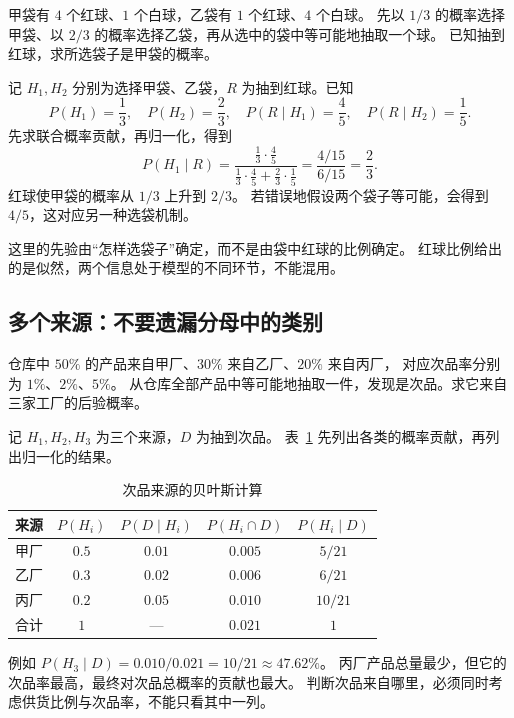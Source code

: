 \documentclass[UTF8,12pt,a4paper,fontset=fandol]{ctexart}
\begin{document}
\begin{example}[抽到红球后判断袋子]
\label{ex:bayes-bags}
甲袋有 $4$ 个红球、$1$ 个白球，乙袋有 $1$ 个红球、$4$ 个白球。
先以 $1/3$ 的概率选择甲袋、以 $2/3$ 的概率选择乙袋，再从选中的袋中等可能地抽取一个球。
已知抽到红球，求所选袋子是甲袋的概率。
\end{example}
\begin{solve}
记 $H_1,H_2$ 分别为选择甲袋、乙袋，$R$ 为抽到红球。已知
\[
  P(H_1)=\frac13,\quad P(H_2)=\frac23,\quad
  P(R\mid H_1)=\frac45,\quad P(R\mid H_2)=\frac15.
\]
先求联合概率贡献，再归一化，得到
\[
  P(H_1\mid R)
  =\frac{\frac13\cdot\frac45}
  {\frac13\cdot\frac45+\frac23\cdot\frac15}
  =\frac{4/15}{6/15}=\frac23.
\]
红球使甲袋的概率从 $1/3$ 上升到 $2/3$。
若错误地假设两个袋子等可能，会得到 $4/5$，这对应另一种选袋机制。
\end{solve}

这里的先验由“怎样选袋子”确定，而不是由袋中红球的比例确定。
红球比例给出的是似然，两个信息处于模型的不同环节，不能混用。

\subsection{多个来源：不要遗漏分母中的类别}

\begin{example}[三家工厂的次品溯源]
\label{ex:bayes-factories}
仓库中 $50\%$ 的产品来自甲厂、$30\%$ 来自乙厂、$20\%$ 来自丙厂，
对应次品率分别为 $1\%$、$2\%$、$5\%$。
从仓库全部产品中等可能地抽取一件，发现是次品。求它来自三家工厂的后验概率。
\end{example}
\begin{solve}
记 $H_1,H_2,H_3$ 为三个来源，$D$ 为抽到次品。
表~\ref{tab:bayes-factories} 先列出各类的概率贡献，再列出归一化的结果。
\begin{table}[htbp]
  \centering
  \caption{次品来源的贝叶斯计算}
  \label{tab:bayes-factories}
  \begin{tabular}{lcccc}
    \toprule
    来源 & $P(H_i)$ & $P(D\mid H_i)$ & $P(H_i\cap D)$ & $P(H_i\mid D)$ \\
    \midrule
    甲厂 & $0.5$ & $0.01$ & $0.005$ & $5/21$ \\
    乙厂 & $0.3$ & $0.02$ & $0.006$ & $6/21$ \\
    丙厂 & $0.2$ & $0.05$ & $0.010$ & $10/21$ \\
    合计 & $1$ & --- & $0.021$ & $1$ \\
    \bottomrule
  \end{tabular}
\end{table}
例如 $P(H_3\mid D)=0.010/0.021=10/21\approx47.62\%$。
丙厂产品总量最少，但它的次品率最高，最终对次品总概率的贡献也最大。
判断次品来自哪里，必须同时考虑供货比例与次品率，不能只看其中一列。
\end{solve}
\end{document}
